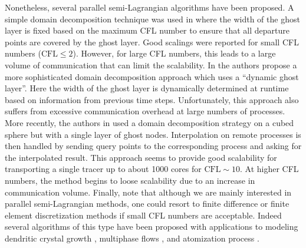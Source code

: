 Nonetheless, several parallel semi-Lagrangian algorithms have been proposed.
A simple domain decomposition technique was used in
\cite{Thomas;Cote:95:Massively-parallel-s} where the width of the ghost layer
is fixed based on the maximum CFL number to ensure that all departure points
are covered by the ghost layer.
Good scalings were reported for small CFL numbers ($\text{CFL} \le 2$).
However, for large CFL numbers, this leads to a large volume of communication that can limit the scalability. In \cite{Drake;Foster;Michalakes;etal:95:Design-and-performan} the authors propose a more sophisticated domain decomposition approach which uses a ``dynamic ghost layer''. Here the width of the ghost layer is dynamically determined at runtime based on information from previous time steps. Unfortunately, this approach also suffers from excessive communication overhead at large numbers of processes. More recently, the authors in \cite{White-III;Dongarra:11:High-performance-hig} used a domain decomposition strategy on a cubed sphere but with a single layer of ghost nodes. Interpolation on remote processes is then handled by sending query points to the corresponding process and asking for the interpolated result. This approach seems to provide good scalability for transporting a single tracer up to about 1000 cores for $\text{CFL} \sim 10$. At higher CFL numbers, the method begins to loose scalability due to an increase in communication volume. Finally, note that although we are mainly interested in parallel semi-Lagrangian methods, one could resort to finite difference or finite element discretization methods if small CFL numbers are acceptable. Indeed several algorithms of this type have been proposed with applications to modeling dendritic crystal growth \cite{Wang;Chang;Kale;etal:06:Parallelization-of-a}, multiphase flows \cite{Sussman:05:A-parallelized-adapt, Fortmeier;Bucker:11:A-parallel-strategy-, Rodriguez;Sahni;Lahey-Jr;etal:13:A-parallel-adaptive-}, and atomization process \cite{Herrmann:10:A-parallel-Eulerian-}.

